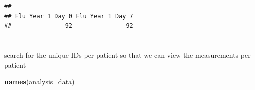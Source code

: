 \documentclass[
]{article}
\newenvironment{Shaded}{\begin{snugshade}}{\end{snugshade}}
\newcommand{\FunctionTok}[1]{\textcolor[rgb]{0.13,0.29,0.53}{\textbf{#1}}}
\newcommand{\NormalTok}[1]{#1}
\begin{document}
\begin{verbatim}
## 
## Flu Year 1 Day 0 Flu Year 1 Day 7 
##               92               92
\end{verbatim}

\section{}\label{section}

search for the unique IDs per patient so that we can view the
measurements per patient

\begin{Shaded}
\begin{Highlighting}[]
\FunctionTok{names}\NormalTok{(analysis\_data)}
\end{Highlighting}
\end{Shaded}
\end{document}
